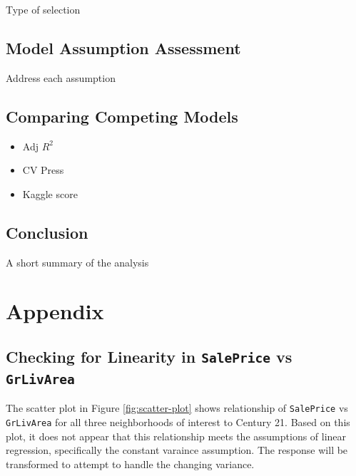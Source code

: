 \documentclass[american,]{article}
\providecommand{\tightlist}{%
  \setlength{\itemsep}{0pt}\setlength{\parskip}{0pt}}
\begin{document}
Type of selection

\hypertarget{model-assumption-assessment}{%
\subsection{Model Assumption
Assessment}\label{model-assumption-assessment}}

Address each assumption

\hypertarget{comparing-competing-models-1}{%
\subsection{Comparing Competing
Models}\label{comparing-competing-models-1}}

\begin{itemize}
\tightlist
\item
  Adj \(R^2\)
\item
  CV Press
\item
  Kaggle score
\end{itemize}

\hypertarget{conclusion-1}{%
\subsection{Conclusion}\label{conclusion-1}}

A short summary of the analysis

\hypertarget{appendix}{%
\section{Appendix}\label{appendix}}

\hypertarget{checking-for-linearity-in-saleprice-vs-grlivarea}{%
\subsection{\texorpdfstring{Checking for Linearity in \texttt{SalePrice}
vs
\texttt{GrLivArea}}{Checking for Linearity in SalePrice vs GrLivArea}}\label{checking-for-linearity-in-saleprice-vs-grlivarea}}

\label{appendix:linearity}

The scatter plot in Figure \ref{fig:scatter-plot} shows relationship of
\texttt{SalePrice} vs \texttt{GrLivArea} for all three neighborhoods of
interest to Century 21. Based on this plot, it does not appear that this
relationship meets the assumptions of linear regression, specifically
the constant varaince assumption. The response will be transformed to
attempt to handle the changing variance.
\end{document}
